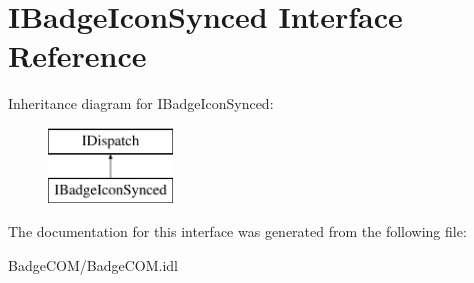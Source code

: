 \hypertarget{interface_i_badge_icon_synced}{\section{I\-Badge\-Icon\-Synced Interface Reference}
\label{interface_i_badge_icon_synced}
}
Inheritance diagram for I\-Badge\-Icon\-Synced\-:\begin{figure}[H]
\begin{center}
\leavevmode
\includegraphics[height=2.000000cm]{interface_i_badge_icon_synced}
\end{center}
\end{figure}


The documentation for this interface was generated from the following file\-:\begin{DoxyCompactItemize}
\item 
Badge\-C\-O\-M/Badge\-C\-O\-M.\-idl\end{DoxyCompactItemize}
